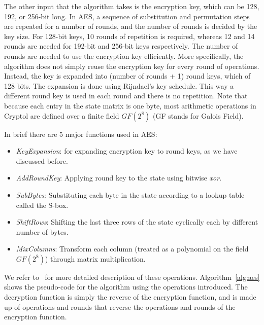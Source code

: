 \documentclass[a4paper, notitlepage]{report}
\begin{document}
The other input that the algorithm takes is the encryption key, which can be 128, 192,
or 256-bit long. In AES, a sequence of substitution and permutation steps are repeated
for a number of rounds, and the number of rounds is decided by the key size.
For 128-bit keys, 10 rounds of repetition is required, whereas 12 and 14 rounds are
needed for 192-bit and 256-bit keys respectively. The number of rounds are needed
to use the encryption key efficiently. More specifically, the algorithm does not
simply reuse the encryption key for every round of operations. Instead, the key is
expanded into (number of rounds + 1) round keys, which of 128 bits. The expansion
is done using Rijndael's key schedule. This way a different round key is used in
each round and there is no repetition. Note that because each entry in the state
matrix is one byte, most arithmetic operations in Cryptol are defined over a finite
field $GF(2^8)$ (GF stands for Galois Field).

In brief there are 5 major functions used in AES:
\begin{itemize}
\item \emph{KeyExpansion}: for expanding encryption key to round keys, as we have
  discussed before.
\item \emph{AddRoundKey}: Applying round key to the state using bitwise \emph{xor}.
\item \emph{SubBytes}: Substituting each byte in the state according to a lookup table
  called the S-box.
\item \emph{ShiftRows}: Shifting the last three rows of the state cyclically each by
  different number of bytes.
\item \emph{MixColumns}: Transform each column (treated as a polynomial on the field
  $GF(2^8)$) through matrix multiplication.
\end{itemize}

We refer to~\cite{standard2001announcing} for more detailed description of these
operations. Algorithm~\ref{alg:aes} shows the pseudo-code for the algorithm using
the operations
introduced.
The decryption function is simply the reverse of the encryption function, and
is made up of operations and rounds that reverse the operations and rounds of
the encryption function.
\end{document}
